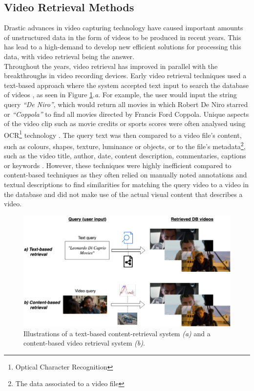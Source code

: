 
\subsection{Video Retrieval Methods}
\label{sec:cbvr-methods}

Drastic advances in video capturing technology have caused important amounts of unstructured data in the form of videos to be produced in recent years. This has lead to a high-demand to develop new efficient solutions for processing this data, with video retrieval being the answer.\\

Throughout the years, video retrieval has improved in parallel with the breakthroughs in video recording devices. Early video retrieval techniques used a text-based approach where the system accepted text input to search the database of videos \cite{lai2015trajectory}, as seen in Figure \ref{fig:text_vs_content_retrieval}.\emph{a}. For example, the user would input the string query \textit{``De Niro''}, which would return all movies in which Robert De Niro starred or \textit{``Coppola''} to find all movies directed by Francis Ford Coppola. Unique aspects of the video clip such as movie credits or sports scores were often analysed using OCR\footnote{Optical Character Recognition} technology \cite{li2002text}. The query text was then compared to a video file's content, such as colours, shapes, texture, luminance or objects, or to the file's metadata\footnote{The data associated to a video file}, such as the video title, author, date, content description, commentaries, captions or keywords \cite{li2002text} \cite{feng2011} \cite{patel2012}. However, these techniques were highly inefficient compared to content-based techniques as they often relied on manually noted annotations and textual descriptions to find similarities for matching the query video to a video in the database and did not make use of the actual visual content that describes a video.\\

\begin{figure}[h]
\centerline{\includegraphics[width=\textwidth]{figures/litsurvey/content_text-retrieval_comparison.png}}
\caption{\label{fig:text_vs_content_retrieval}Illustrations of a text-based content-retrieval system \emph{(a)} and a content-based video retrieval system \emph{(b)}.}
\end{figure}

